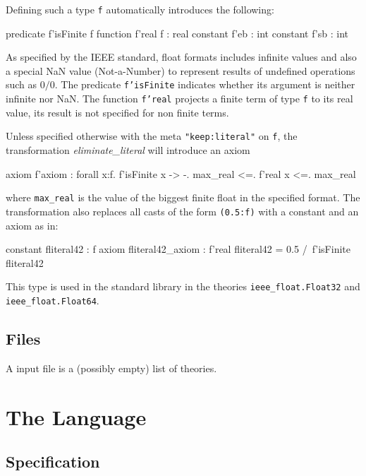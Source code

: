 Defining such a type \texttt{f} automatically introduces the following:
\begin{whycode}
  predicate f'isFinite f
  function  f'real f : real
  constant  f'eb : int
  constant  f'sb : int
\end{whycode}
As specified by the IEEE standard, float formats includes infinite
values and also a special NaN value (Not-a-Number) to represent
results of undefined operations such as $0/0$.  The predicate
\texttt{f'isFinite} indicates whether its argument is neither infinite
nor NaN. The function \texttt{f'real} projects a finite term of type
\texttt{f} to its real value, its result is not specified for non finite
terms.

Unless specified otherwise with the meta \texttt{"keep:literal"} on
\texttt{f}, the transformation \emph{eliminate\_literal} will
introduce an axiom
\begin{whycode}
axiom f'axiom :
  forall x:f. f'isFinite x -> -. max_real <=. f'real x <=. max_real
\end{whycode}
where \texttt{max\_real} is the value of the biggest finite float in
the specified format. The transformation also replaces all casts of
the form \texttt{(0.5:f)} with a constant and an axiom as in:
\begin{whycode}
constant fliteral42 : f
axiom fliteral42_axiom : f'real fliteral42 = 0.5 /\ f'isFinite fliteral42
\end{whycode}

This type is used in the standard library in the theories
\texttt{ieee\_float.Float32} and \texttt{ieee\_float.Float64}.

\subsection{Files}

A \why input file is a (possibly empty) list of theories.
\begin{center}\framebox{}\end{center}


\clearpage
\section{The \whyml Language}\label{sec:syntax:whyml}

\subsection{Specification}

